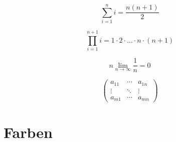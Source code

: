 \begin{equation}\label{eq:summe2}%
	\sum \limits_{i=1}^n i = \frac{n(n+1)}{2}
\end{equation}

\begin{equation}\label{eq:fak}%
	\prod \limits_{i=1}^{n+1}i = 1\cdot 2\cdot\dots\cdot n\cdot (n+1)
\end{equation}

\begin{equation}\label{eq:lim}n
	\lim\limits_{n \to \infty}\frac{1}{n}=0
\end{equation}

\begin{equation}\label{eq:matrix}%
	\left(
	\begin{array}{ccc}
		a_{11} & \cdots & a_{1n} \\
		\vdots & \ddots & \vdots \\
		a_{m1} & \cdots & a_{mn}
	\end{array}
	\right)	
\end{equation}


\section{Farben}\label{sec:farben}

